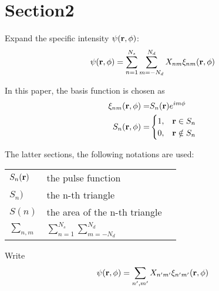 \documentclass[main]{subfiles}
\begin{document}
\section{Section2}
\label{sec:Section2}
Expand the specific intensity $\psi(\mathbf{r},\phi)$:
\begin{equation*}
	\psi(\mathbf{r},\phi)=\sum\limits_{n=1}^{N_s}\sum\limits_{m=-N_d}^{N_d}
	X_{nm}\xi_{nm}(\mathbf{r},\phi)
\end{equation*}

In this paper, the basis function is chosen as
\begin{align*}
	\xi_{nm}(\mathbf{r},\phi) =& S_n(\mathbf{r})e^{i m \phi}		\\ 
	S_n(\mathbf{r},\phi) =& \begin{cases}
		1, & \mathbf{r}\in S_n \\
		0, & \mathbf{r}\notin S_n
	\end{cases}
\end{align*}

The latter sections, the following notations are used:
\begin{center} \begin{tabular}{lll}
	$S_n(\mathbf{r})$	&	the pulse function		\\
	$S_n)$		&	the n-th triangle		\\
	$S(n)$		&	the area of the n-th triangle	\\
	$\sum\nolimits_{n,m}$	&
	$\sum\nolimits_{n=1}^{N_s}\sum\nolimits_{m=-N_d}^{N_d}$	\\
\end{tabular} \end{center}

Write
\begin{equation} \label{expansion of psi}
	\psi(\mathbf{r},\phi)=\sum\limits_{n^{\prime},m^{\prime}}
	X_{n^{\prime} m^{\prime}}\xi_{n^{\prime} m^{\prime}}(\mathbf{r},\phi)
\end{equation}
\end{document}
